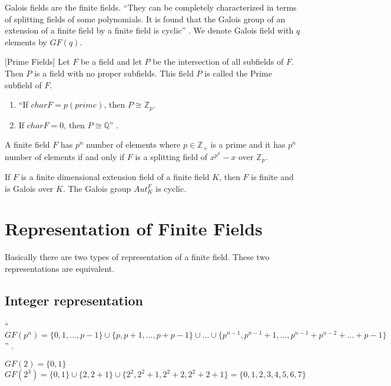 Galois fields are the finite fields. ``They can be completely characterized in terms of splitting fields of some polynomials. It is found that the Galois group of an extension of a finite field by a finite field is cyclic'' \cite{hunger}. We denote Galois field with \(q\) elements by \(GF(q)\).

\begin{definition} \cite{hunger} [Prime Fields]
Let \(F\) be a field and let \(P\) be the intersection of all subfields of \(F\). Then \(P\) is a field with no proper subfields. This field \(P\) is called the Prime subfield of \(F\).
\end{definition}

\begin{enumerate}
\item ``If \(charF=p(prime)\), then \(P\cong {\mathbb{Z}}_p\).
\item If \(charF=0\), then \(P\cong \mathbb{Q}\)'' \cite{hunger}.
\end{enumerate}

\begin{theorem} \cite{hunger}
A  finite field \(F\) has \(p^n\) number of elements where \(p \in \mathbb{Z}_+\) is a prime and it has \(p^n\) number of elements if and only if \(F\) is a splitting field of \(x^{p^n} - x\) over \(\mathbb{Z}_p\).
\end{theorem}
\vspace{4mm}

\begin{theorem} \cite{hunger}
  If \(F\) is a finite dimensional extension field of a finite field \(K\), then \(F\) is finite and is Galois over \(K\). The Galois group \(Aut_K^F\) is cyclic.
\end{theorem}

\section{Representation of Finite Fields}
Basically there are two types of representation of a finite field. These two representations are equivalent.
\subsection{Integer representation}

``\(GF(p^n)=\{0,1,...,p-1\} \cup \{p,p+1,...,p+p-1\} \cup ... \cup \{p^{n-1},p^{n-1}+1,...,p^{n-1}+p^{n-2}+...+p-1\}\)'' \cite{galois}.

\begin{example}
    \(GF(2)=\{0,1\}\)\\
    \(GF(2^3)=\{0,1\} \cup \{2,2+1\} \cup \{2^2,2^2+1,2^2+2,2^2+2+1\}=\{0,1,2,3,4,5,6,7\}\)
\end{example}

